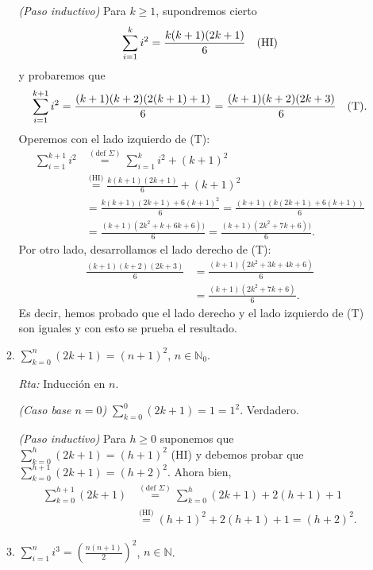 \documentclass[a4paper,12pt,twoside,spanish,reqno]{amsbook}
\numberwithin{equation}{section}
\newcommand{\rta}{\noindent\textit{Rta: }}
\begin{document}
\begin{enumerate}
\begin{enumerate}
            \textit{(Paso inductivo) } Para  $k \ge 1$,  supondremos cierto 
            $$\sum_{i=1}^{k} i^2 = \frac{k(k+1)(2k+1)}{6} \text{\quad (HI)}$$
            y probaremos que 
            $$\sum_{i=1}^{k+1} i^2 = \frac{(k+1)(k+2)(2(k+1)+1)}{6} = \frac{(k+1)(k+2)(2k+3)}{6} \text{\quad (T)}.$$ 
            Operemos con el lado izquierdo de (T):
            \begin{align*}
            \sum_{i=1}^{k+1} i^2 &\overset{(\text{def } \Sigma)}{=} \sum_{i=1}^{k} i^2 + (k+1)^2 \\ &\overset{\text{(HI)}}{=} \frac{k(k+1)(2k+1)}{6}  + (k+1)^2 \\ &=   \frac{k(k+1)(2k+1) + 6(k+1)^2}{6} = \frac{(k+1)(k(2k+1) + 6(k+1))}{6} \\ &= \frac{(k+1)(2k^2+k + 6k+6))}{6} =  \frac{(k+1)(2k^2+7k+6))}{6}.
            \end{align*}
            Por otro lado,  desarrollamos el lado derecho de (T): 
            \begin{align*}
                \frac{(k+1)(k+2)(2k+3)}{6} &= \frac{(k+1)(2k^2+3k +4k +6)}{6} \\&= \frac{(k+1)(2k^2+7k +6)}{6}.
            \end{align*}
            Es decir,  hemos probado que el lado derecho y el lado izquierdo de (T) son iguales y con esto se prueba el resultado. 
            
            \item  $\displaystyle{ \sum_{k=0}^n (2k+1) = (n+1)^2}$, $n\in \mathbb N_0$.
            
            \rta Inducción en $n$.
            
            \textit{(Caso base $n=0$) } $\sum_{k=0}^0 (2k+1) = 1 = 1^2$. Verdadero.
            
            \textit{(Paso inductivo) } Para $h \ge 0$ suponemos que $\sum_{k=0}^h (2k+1) = (h+1)^2$ (HI) y debemos probar que $\sum_{k=0}^{h+1} (2k+1) = (h+2)^2$. Ahora bien, 
            \begin{align*}
                \sum_{k=0}^{h+1} (2k+1) &\overset{(\text{def } \Sigma)}{=} \sum_{k=0}^h (2k+1) + 2(h+1) +1 \\ &\overset{\text{(HI)}}{=}  (h+1)^2 + 2(h+1) +1 = (h+2)^2.
            \end{align*}
            
            \item  $\displaystyle{ \sum_{i=1}^n i^3 = \left( \frac{n(n+1)}{2 }\right)^2}$, $n\in \mathbb N$.
            

\end{enumerate}
\end{enumerate}
\end{document}
